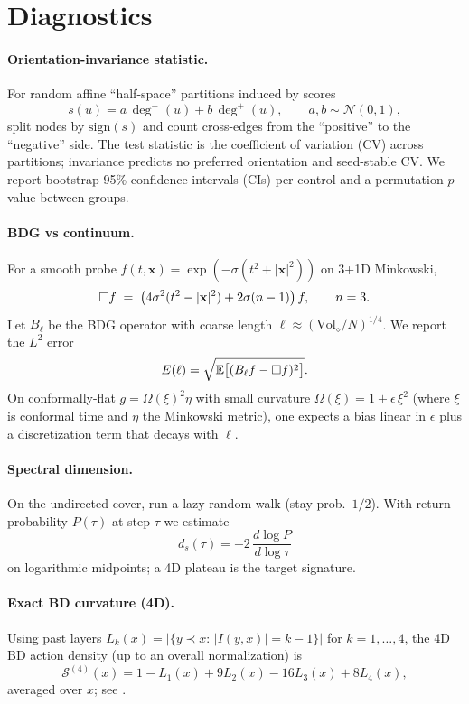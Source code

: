 \section{Diagnostics}
\paragraph{Orientation-invariance statistic.}
For random affine ``half-space'' partitions induced by scores
\[
s(u)=a\,\deg^{-}(u)+b\,\deg^{+}(u),\qquad a,b\sim\mathcal{N}(0,1),
\]
split nodes by $\mathrm{sign}(s)$ and count cross-edges from the ``positive'' to the ``negative'' side.
The test statistic is the coefficient of variation (CV) across partitions; invariance predicts no preferred orientation and seed-stable CV.
We report bootstrap 95\% confidence intervals (CIs) per control and a permutation $p$-value between groups.

\paragraph{BDG vs continuum.}
For a smooth probe $f(t,\mathbf{x})=\exp(-\sigma(t^2+|\mathbf{x}|^2))$ on 3+1D Minkowski,
\[
\Box f \;=\; \big(4\sigma^2(t^2-|\mathbf{x}|^2)+2\sigma(n-1)\big)\,f,\qquad n=3.
\]
Let $B_\ell$ be the BDG operator with coarse length $\ell\approx (\mathrm{Vol}_\diamond/N)^{1/4}$.
We report the $L^2$ error
\[
E(\ell)=\sqrt{\mathbb{E}\big[(B_\ell f-\Box f)^2\big]}.
\]
On conformally-flat $g=\Omega(\xi)^2\eta$ with small curvature $\Omega(\xi)=1+\epsilon\,\xi^2$ (where $\xi$ is conformal time and $\eta$ the Minkowski metric),
one expects a bias linear in $\epsilon$ plus a discretization term that decays with $\ell$.

\paragraph{Spectral dimension.}
On the undirected cover, run a lazy random walk (stay prob.\ $1/2$).
With return probability $P(\tau)$ at step $\tau$ we estimate
\[
d_s(\tau)=-2\,\frac{d\log P}{d\log \tau}
\]
on logarithmic midpoints; a 4D plateau is the target signature.

\paragraph{Exact BD curvature (4D).}
Using past layers $L_k(x)=|\{y\prec x:\,|I(y,x)|=k-1\}|$ for $k=1,\dots,4$, the 4D BD action density (up to an overall normalization) is
\begin{equation}
\label{eq:bd4}
\mathcal{S}^{(4)}(x)=1 - L_1(x) + 9 L_2(x) - 16 L_3(x) + 8 L_4(x),
\end{equation}
averaged over $x$; see \citet{BenincasaDowker2010,Glaser2011DICE}.

